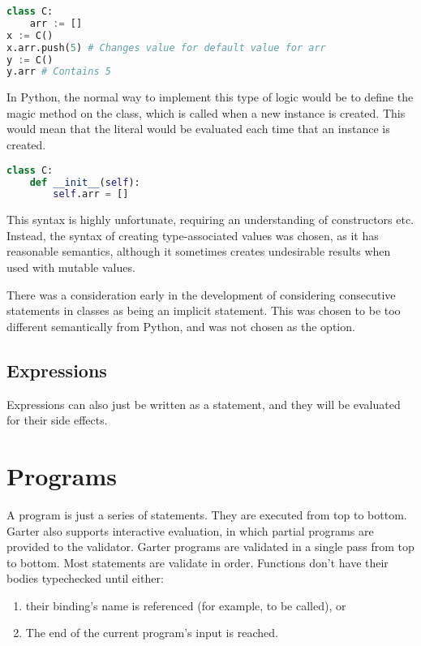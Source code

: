 \begin{lstlisting}[language=Python]
class C:
    arr := []
x := C()
x.arr.push(5) # Changes value for default value for arr
y := C()
y.arr # Contains 5
\end{lstlisting}

In Python, the normal way to implement this type of logic would be to define the
magic  method on the class, which is called when a new
instance is created. This would mean that the \code{[]} literal would be
evaluated each time that an instance is created.

\begin{lstlisting}[language=Python]
class C:
    def __init__(self):
        self.arr = []
\end{lstlisting}

This syntax is highly unfortunate, requiring an understanding of constructors
etc. Instead, the syntax of creating type-associated values was chosen, as it
has reasonable semantics, although it sometimes creates undesirable results
when used with mutable values.

There was a consideration early in the development of considering consecutive
\code{:=} statements in classes as being an implicit 
statement. This was chosen to be too different semantically from Python, and
was not chosen as the option.

\subsection{Expressions}

Expressions can also just be written as a statement, and they will be evaluated
for their side effects.

\section{Programs}

A program is just a series of statements. They are executed from top to bottom.
Garter also supports interactive evaluation, in which partial programs are
provided to the validator. Garter programs are validated in a single pass from
top to bottom. Most statements are validate in order. Functions don't have their
bodies typechecked until either:

\begin{enumerate}
\item their binding's name is referenced (for example, to be called), or
\item The end of the current program's input is reached.
\end{enumerate}

